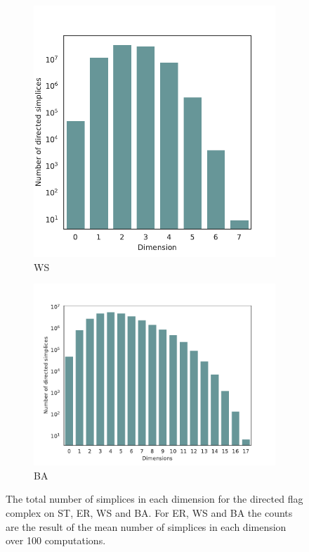 \begin{figure}[ht]
\begin{subfigure}{.45 \linewidth}
    \includegraphics[scale=0.49]{./counts/random50k_ws_count.pdf}
    \caption{WS}
  \end{subfigure}
  \begin{subfigure}{.49 \linewidth}
    \includegraphics[scale=0.49]{./counts/random50k_ba_count.pdf}
    \caption{BA}
  \end{subfigure}
  \caption{\label{count50k}The total number of simplices in each dimension for the directed flag complex on ST, ER, WS and BA. For ER, WS and BA the counts are the result of the mean number of simplices in each dimension over 100 computations.}
\end{figure}
